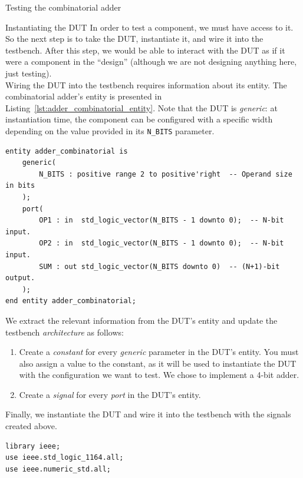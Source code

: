 \documentclass[lab]{course}
\begin{document}
\begin{section}{Testing the combinatorial adder}
    \clearpage

    \begin{subsection}{Instantiating the DUT}
        \label{sec:combinatorial_instantiating_dut}
        In order to test a component, we must have access to it. So the next step is to take the DUT, instantiate it, and wire it into the testbench. After this step, we would be able to interact with the DUT as if it were a component in the ``design'' (although we are not designing anything here, just testing). \\

        Wiring the DUT into the testbench requires information about its entity. The combinatorial adder's entity is presented in Listing~\ref{lst:adder_combinatorial_entity}. Note that the DUT is \emph{generic}: at instantiation time, the component can be configured with a specific width depending on the value provided in its \verb+N_BITS+ parameter.

        \begin{lstlisting}[caption={\texttt{adder\_combinatorial} entity}, label={lst:adder_combinatorial_entity}]
entity adder_combinatorial is
    generic(
        N_BITS : positive range 2 to positive'right  -- Operand size in bits
    );
    port(
        OP1 : in  std_logic_vector(N_BITS - 1 downto 0);  -- N-bit input.
        OP2 : in  std_logic_vector(N_BITS - 1 downto 0);  -- N-bit input.
        SUM : out std_logic_vector(N_BITS downto 0)  -- (N+1)-bit output.
    );
end entity adder_combinatorial;
        \end{lstlisting}

        We extract the relevant information from the DUT's entity and update the testbench \emph{architecture} as follows:

        \begin{enumerate}
            \item Create a \emph{constant} for every \emph{generic} parameter in the DUT's entity. You must also assign a value to the constant, as it will be used to instantiate the DUT with the configuration we want to test. We chose to implement a 4-bit adder.
            \item Create a \emph{signal} for every \emph{port} in the DUT's entity.
        \end{enumerate}

        Finally, we instantiate the DUT and wire it into the testbench with the signals created above.

        \begin{lstlisting}[caption={Instantiate DUT}, label={lst:combinatorial_instantiate_dut}]
library ieee;
use ieee.std_logic_1164.all;
use ieee.numeric_std.all;


\end{lstlisting}
\end{subsection}
\end{section}
\end{document}
